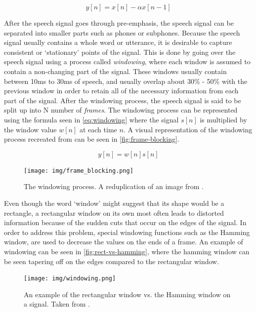 \documentclass
[
    a4paper,
    twoside,
    12pt,
]
{report}
\begin{document}
\begin{equation}
\label{eq:pre-emphasis-filter}
y[n] = x[n] - \alpha x[n - 1]
\end{equation}

After the speech signal goes through pre-emphasis, the speech signal can
be separated into smaller parts such as phones or subphones. Because the
speech signal usually contains a whole word or utterance, it is
desirable to capture consistent or `stationary' points of the signal.
This is done by going over the speech signal using a process called
\emph{windowing}, where each window is assumed to contain a non-changing
part of the signal. These windows usually contain between 10ms to 30ms
of speech, and usually overlap about 30\% - 50\% with the previous
window in order to retain all of the necessary information from each
part of the signal. After the windowing process, the speech signal is
said to be split up into N number of \emph{frames}. The windowing
process can be represented using the formula seen in
\autoref{eq:windowing} where the signal \(s[n]\) is multiplied by the
window value \(w[n]\) at each time \(n\). A visual representation of the
windowing process recreated from \textcite{demarco2015} can be seen in
\autoref{fig:frame-blocking}.

\begin{equation}
\label{eq:windowing}
y[n] = w[n]s[n]
\end{equation}

\begin{figure}[]
\centering
\texttt{[image: img/frame\_blocking.png]}
\caption{The windowing process. A reduplication of an image from \textcite{demarco2015}.}
\label{fig:frame-blocking}
\end{figure}

Even though the word `window' might suggest that its shape would be a
rectangle, a rectangular window on its own most often leads to distorted
information because of the sudden cuts that occur on the edges of the
signal. In order to address this problem, special windowing functions
such as the Hamming window, are used to decrease the values on the ends
of a frame. An example of windowing can be seen in
\autoref{fig:rect-vs-hamming}, where the hamming window can be seen
tapering off on the edges compared to the rectangular window.

\begin{figure}[]
\centering
\texttt{[image: img/windowing.png]}
\caption{An example of the rectangular window vs. the Hamming window on a signal. Taken from \textcite{lebourdais2015}.}
\label{fig:rect-vs-hamming}
\end{figure}
\end{document}
